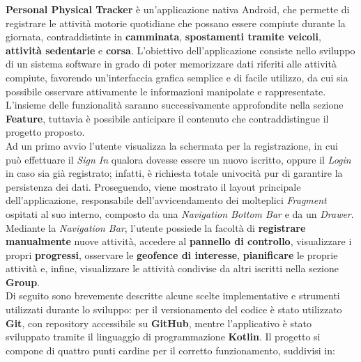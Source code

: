 \documentclass{article}
\begin{document}
    \textbf{Personal Physical Tracker} è un'applicazione nativa Android, che permette di registrare le attività motorie quotidiane che possano essere compiute durante la giornata,
    contraddistinte in \textbf{camminata}, \textbf{spostamenti tramite veicoli}, \textbf{attività sedentarie} e \textbf{corsa}.
    L'obiettivo dell'applicazione consiste nello sviluppo di un sistema software in grado di poter memorizzare dati riferiti alle attività compiute, favorendo un'interfaccia 
    grafica semplice e di facile utilizzo, da cui sia possibile osservare attivamente le informazioni manipolate e rappresentate.
    L'insieme delle funzionalità saranno successivamente approfondite nella sezione \textbf{Feature}, tuttavia è possibile anticipare il contenuto che contraddistingue il progetto
    proposto. \vspace*{7pt}\\
    Ad un primo avvio l'utente visualizza la schermata per la registrazione, in cui può effettuare il \textit{Sign In} qualora dovesse essere un nuovo iscritto, oppure il 
    \textit{Login} in caso sia già registrato; infatti, è richiesta totale univocità pur di garantire la persistenza dei dati. 
    Proseguendo, viene mostrato il layout principale dell'applicazione, responsabile dell'avvicendamento dei molteplici \textit{Fragment} ospitati al suo interno, composto da una
    \textit{Navigation Bottom Bar} e da un \textit{Drawer}. Mediante la \textit{Navigation Bar}, l'utente possiede la facoltà di \textbf{registrare manualmente} nuove attività, 
    accedere al \textbf{pannello di controllo}, visualizzare i propri \textbf{progressi}, osservare le \textbf{geofence di interesse}, \textbf{pianificare} le proprie attività e,
    infine, visualizzare le attività condivise da altri iscritti nella sezione \textbf{Group}. \vspace{7pt}\\
    Di seguito sono brevemente descritte alcune scelte implementative e strumenti utilizzati durante lo sviluppo: per il versionamento del codice è stato utilizzato \textbf{Git},
    con repository accessibile su \textbf{GitHub}, mentre l'applicativo è stato sviluppato tramite il linguaggio di programmazione \textbf{Kotlin}. Il progetto si 
    compone di quattro punti cardine per il corretto funzionamento, suddivisi in:
\end{document}
